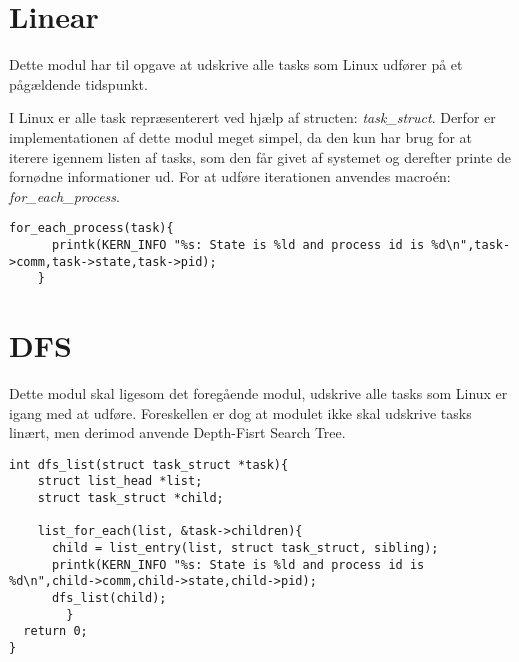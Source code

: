 \section{Linear}
Dette modul har til opgave at udskrive alle tasks som Linux udfører på et pågældende tidspunkt. 

I Linux er alle task repræsenterert ved hjælp af structen: \textit{task\_struct}. Derfor er implementationen af dette modul meget simpel, da den kun har brug for at iterere igennem listen af tasks, som den får givet af systemet og derefter printe de fornødne informationer ud. For at udføre iterationen anvendes macroén: \textit{for\_each\_process}.

\begin{lstlisting}
for_each_process(task){
	  printk(KERN_INFO "%s: State is %ld and process id is %d\n",task->comm,task->state,task->pid);
	}
\end{lstlisting}

\section{DFS}
Dette modul skal ligesom det foregående modul, udskrive alle tasks som Linux er igang med at udføre. Foreskellen er dog at modulet ikke skal udskrive tasks linært, men derimod anvende Depth-Fisrt Search Tree.
\\
\begin{lstlisting}
int dfs_list(struct task_struct *task){
	struct list_head *list;	  
	struct task_struct *child;

  	list_for_each(list, &task->children){
	  child = list_entry(list, struct task_struct, sibling);	
	  printk(KERN_INFO "%s: State is %ld and process id is %d\n",child->comm,child->state,child->pid);
	  dfs_list(child);
        }
  return 0;
}
\end{lstlisting}